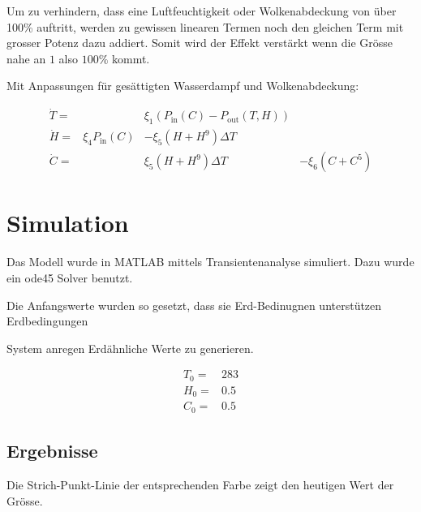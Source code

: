 \begin{refsection}
Um zu verhindern, dass eine Luftfeuchtigkeit oder Wolkenabdeckung von über 100\% auftritt, werden zu gewissen linearen Termen noch den gleichen Term mit grosser Potenz dazu addiert. Somit wird der Effekt verstärkt wenn die Grösse nahe an $1$ also $100\%$ kommt.  

Mit Anpassungen für gesättigten Wasserdampf und Wolkenabdeckung:

\begin{equation}
\begin{matrix}
\dot{T} = & & \xi_1 \left(P_{\text{in}}(C) - P_{\text{out}}(T, H) \right) &\\
\dot{H} = & \xi_4 P_{\text{in}}(C) & - \xi_5 (H + H^9) \Delta T & \\
\dot{C} = &                       &   \xi_5 (H + H^9) \Delta T & - \xi_6 (C + C^5)
\end{matrix}
\end{equation}


\section{Simulation}

Das Modell wurde in MATLAB mittels Transientenanalyse simuliert. Dazu wurde ein ode45 Solver benutzt.




Die Anfangswerte wurden so gesetzt, dass sie Erd-Bedinugnen unterstützen  
	Erdbedingungen
	
	System anregen Erdähnliche Werte zu generieren.

\begin{equation}
\begin{matrix}
T_0 = & 283 \\
H_0 = & 0.5 \\
C_0 = & 0.5
\end{matrix}
\end{equation}

\subsection{Ergebnisse}

		Die Strich-Punkt-Linie der entsprechenden Farbe zeigt den heutigen Wert der Grösse. 


\end{refsection}
